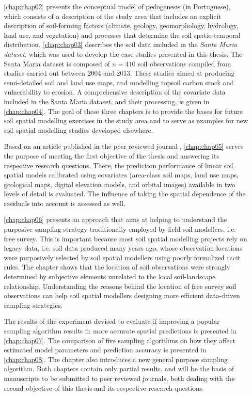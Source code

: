 \autoref{chap:chap02} presents the conceptual model of pedogenesis (in Portuguese), which consists of a 
description of the study area that includes an explicit description of soil-forming factors (climate, geology, 
geomorphology, hydrology, land use, and vegetation) and processes that determine the soil spatio-temporal 
distribution. \autoref{chap:chap03} describes the soil data included in the \emph{Santa Maria dataset}, which 
was used to develop the case studies presented in this thesis. The Santa Maria dataset is composed of 
$n = 410$ soil observations compiled from studies carried out between \num{2004} and \num{2013}. These studies 
aimed at producing semi-detailed soil and land use maps, and modelling topsoil carbon stock and vulnerability 
to erosion. A comprehensive description of the covariate data included in the Santa Maria dataset, and their 
processing, is given in \autoref{chap:chap04}. The goal of these three chapters is to provide the bases for 
future soil spatial modelling exercises in the study area and to serve as examples for new soil spatial 
modelling studies developed elsewhere.

Based on an article published in the peer reviewed journal \geoderma, \autoref{chap:chap05} serves the purpose 
of meeting the first objective of the thesis and answering its respective research questions. There, the 
prediction performance of linear soil spatial models calibrated using covariates (area-class soil maps, land 
use maps, geological maps, digital elevation models, and orbital images) available in two levels of detail is 
evaluated. The influence of taking the spatial dependence of the residuals into account is assessed as well. 

\autoref{chap:chap06} presents an approach that aims at helping to understand the purposive sampling strategy 
traditionally employed by field soil modellers, i.e. free survey. This is important because most soil 
spatial modelling projects rely on legacy data, i.e. soil data produced many years ago, whose observation 
locations were purposively selected by soil spatial modellers using poorly formalized tacit rules. The chapter 
shows that the location of soil observations were strongly determined by subjective elements unrelated to the 
local soil-landscape relationship. Understanding the reasons behind the location of free survey soil 
observations can help soil spatial modellers designing more efficient data-driven sampling strategies.

The results of the experiment devised to evaluate if improving a popular sampling algorithm results in more 
accurate spatial predictions is presented in \autoref{chap:chap07}. The comparison of five sampling algorithms 
on how they affect estimated model parameters and prediction accuracy is presented in \autoref{chap:chap08}. 
The chapter also introduces a new general purpose sampling algorithm. Both chapters contain only partial 
results, and will be the basis of manuscripts to be submitted to peer reviewed journals, both dealing with the 
second objective of this thesis and its respective research questions.

